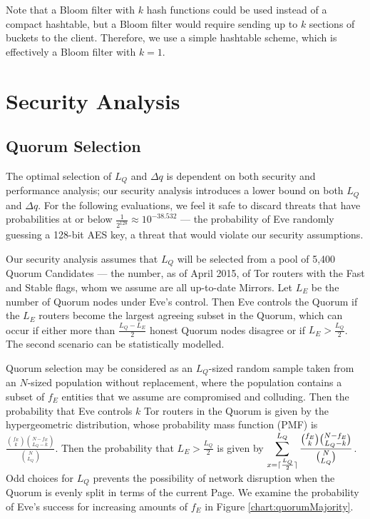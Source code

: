 \documentclass{sig-alternate}
\DeclarePairedDelimiter{\ceil}{\lceil}{\rceil}
\begin{document}
Note that a Bloom filter with $ k $ hash functions could be used instead of a compact hashtable, but a Bloom filter would require sending up to $ k $ sections of buckets to the client. Therefore, we use a simple hashtable scheme, which is effectively a Bloom filter with $ k = 1 $.














\section{Security Analysis}

\subsection{Quorum Selection}

The optimal selection of $ L_{Q} $ and $ \Delta q $ is dependent on both security and performance analysis; our security analysis introduces a lower bound on both $ L_{Q} $ and $ \Delta q $. For the following evaluations, we feel it safe to discard threats that have probabilities at or below $ \frac{1}{2^{128}} \approx 10^{-38.532} $ --- the probability of Eve randomly guessing a 128-bit AES key, a threat that would violate our security assumptions.

Our security analysis assumes that $ L_{Q} $ will be selected from a pool of 5,400 Quorum Candidates --- the number, as of April 2015, of Tor routers with the Fast and Stable flags, whom we assume are all up-to-date Mirrors. Let $ L_{E} $ be the number of Quorum nodes under Eve's control. Then Eve controls the Quorum if the $ L_{E} $ routers become the largest agreeing subset in the Quorum, which can occur if either more than $ \frac{L_{Q} - L_{E}}{2} $ honest Quorum nodes disagree or if $ L_{E} > \frac{L_{Q}}{2} $. The second scenario can be statistically modelled.

Quorum selection may be considered as an $ L_{Q} $-sized random sample taken from an $ N $-sized population without replacement, where the population contains a subset of $ f_{E} $ entities that we assume are compromised and colluding. Then the probability that Eve controls $ k $ Tor routers in the Quorum is given by the hypergeometric distribution, whose probability mass function (PMF) is $ \frac{\binom{f_{E}}{k}\binom{N - f_{E}}{L_{Q} - k}}{\binom{N}{L_{Q}}} $. Then the probability that $ L_{E} > \frac{L_{Q}}{2} $ is given by $ \displaystyle\sum_{x=\ceil{\frac{L_{Q}}{2}}}^{L_{Q}} \frac{\binom{f_{E}}{k}\binom{N - f_{E}}{L_{Q} - k}}{\binom{N}{L_{Q}}} $. Odd choices for $ L_{Q} $ prevents the possibility of network disruption when the Quorum is evenly split in terms of the current Page. We examine the probability of Eve's success for increasing amounts of $ f_{E} $ in Figure \ref{chart:quorumMajority}.
\end{document}
